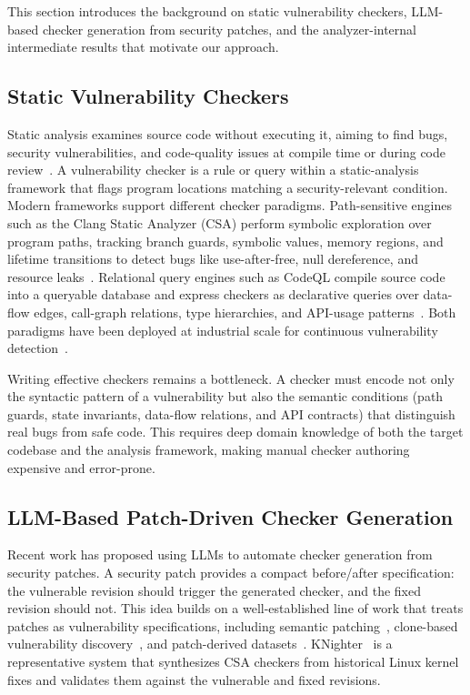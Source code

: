 This section introduces the background on static vulnerability checkers, LLM-based checker generation from security patches, and the analyzer-internal intermediate results that motivate our approach.

\subsection{Static Vulnerability Checkers}

Static analysis examines source code without executing it, aiming to find bugs, security vulnerabilities, and code-quality issues at compile time or during code review~\cite{engler2001bugs,bessey2010coverity}.
A vulnerability checker is a rule or query within a static-analysis framework that flags program locations matching a security-relevant condition.
Modern frameworks support different checker paradigms.
Path-sensitive engines such as the Clang Static Analyzer (CSA) perform symbolic exploration over program paths, tracking branch guards, symbolic values, memory regions, and lifetime transitions to detect bugs like use-after-free, null dereference, and resource leaks~\cite{clangsaDocs}.
Relational query engines such as CodeQL compile source code into a queryable database and express checkers as declarative queries over data-flow edges, call-graph relations, type hierarchies, and API-usage patterns~\cite{avgustinov2016ql,codeqlDocs}.
Both paradigms have been deployed at industrial scale for continuous vulnerability detection~\cite{sadowski2015tricorder,calcagno2015infer}.

Writing effective checkers remains a bottleneck.
A checker must encode not only the syntactic pattern of a vulnerability but also the semantic conditions (path guards, state invariants, data-flow relations, and API contracts) that distinguish real bugs from safe code.
This requires deep domain knowledge of both the target codebase and the analysis framework, making manual checker authoring expensive and error-prone.

\subsection{LLM-Based Patch-Driven Checker Generation}

Recent work has proposed using LLMs to automate checker generation from security patches.
A security patch provides a compact before/after specification: the vulnerable revision should trigger the generated checker, and the fixed revision should not.
This idea builds on a well-established line of work that treats patches as vulnerability specifications, including semantic patching~\cite{padioleau2008coccinelle}, clone-based vulnerability discovery~\cite{jang2012redebug,kim2017vuddy}, and patch-derived datasets~\cite{fan2020bigvul}.
KNighter~\cite{yang2025knighter} is a representative system that synthesizes CSA checkers from historical Linux kernel fixes and validates them against the vulnerable and fixed revisions.


